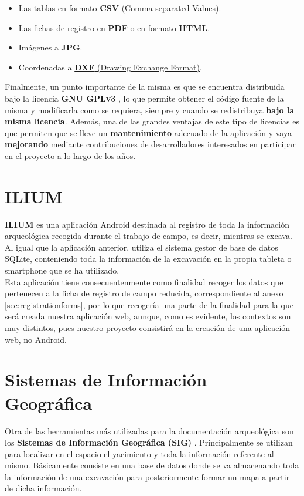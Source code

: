     \begin{itemize}
        \item Las tablas en formato \href{https://dev.socrata.com/docs/formats/csv.html}
        {\textbf{CSV} (Comma-separated Values)}.
        \item Las fichas de registro en \textbf{PDF} o en formato \textbf{HTML}.
        \item Imágenes a \textbf{JPG}.
        \item Coordenadas a \href{https://docs.fileformat.com/cad/dxf/}
        {\textbf{DXF} (Drawing Exchange Format)}.
    \end{itemize}

Finalmente, un punto importante de la misma es que se encuentra distribuida bajo la
licencia \textbf{GNU GPLv3} \cite{gplv3}, lo que permite obtener el código fuente de
la misma y modificarla como se requiera, siempre y cuando se redistribuya \textbf{bajo la
misma licencia}. Además, una de las grandes ventajas de este tipo de licencias es que
permiten que se lleve un \textbf{mantenimiento} adecuado de la aplicación y vaya
\textbf{mejorando} mediante contribuciones de desarrolladores interesados en participar en
el proyecto a lo largo de los años. \\


\section{ILIUM}
\textbf{ILIUM} \cite{ilium} es una aplicación Android destinada al registro de toda la
información arqueológica recogida durante el trabajo de campo, es decir, mientras se
excava. Al igual que la aplicación anterior, utiliza el sistema gestor de base de datos
SQLite, conteniendo toda la información de la excavación en la propia tableta o smartphone
que se ha utilizado.\\

Esta aplicación tiene consecuentenmente como finalidad recoger los datos que pertenecen a
la ficha de registro de campo reducida, correspondiente al anexo \ref{sec:registrationforms},
por lo que recogería una parte de la finalidad para la que será creada nuestra aplicación web,
aunque, como es evidente, los contextos son muy distintos, pues nuestro proyecto consistirá
en la creación de una aplicación web, no Android. \\


\section{Sistemas de Información Geográfica}
Otra de las herramientas más utilizadas para la documentación arqueológica son los
\textbf{Sistemas de Información Geográfica (SIG)} \cite{gis}. Principalmente se utilizan
para localizar en el espacio el yacimiento y toda la información referente al mismo.
Básicamente consiste en una base de datos donde se va almacenando toda la información de una
excavación para posteriormente formar un mapa a partir de dicha información. \\

